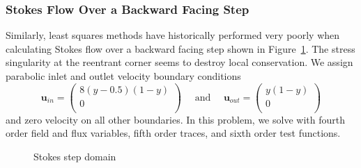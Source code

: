 \documentclass[letterpaper]{article}
\newcommand{\bfu}{\boldsymbol u}
\def\vecttwo#1#2{\left(
\begin{array}{c}
#1\\
#2\\
\end{array}
\right)}
\begin{document}
\subsubsection{Stokes Flow Over a Backward Facing Step}\label{sec:stokesStep}
Similarly, least squares methods have historically performed very poorly when
calculating Stokes flow over a backward facing step shown in
Figure~\ref{fig:stokesStepDomain}. The stress singularity at
the reentrant corner seems to destroy local conservation. We
assign parabolic inlet and outlet velocity boundary conditions
\[
\bfu_{in}=\vecttwo{8(y-0.5)(1-y)}{0}
\quad\text{ and }\quad
\bfu_{out}=\vecttwo{y(1-y)}{0}
\]
and zero velocity on all other boundaries. In this problem, we solve with
fourth order field and flux variables, fifth order traces, and sixth order
test functions.

\begin{figure}[p]
\centering
{}
\caption{Stokes step domain}
\label{fig:stokesStepDomain}
\end{figure}
\end{document}
